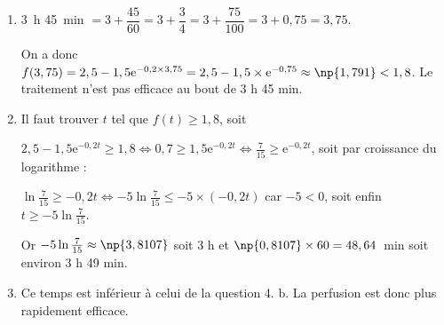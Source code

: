 %
%
%
\begin{enumerate}
\item %
 3~h 45~min $= 3 + \dfrac{45}{60} = 3 + \dfrac{3}{4} = 3 + \dfrac{75}{100} = 3 + 0,75 = 3,75$.
 
 On a donc $f(3,75) = 2,5 - 1,5\text{e}^{-0,2 \times 3,75} = 2,5 - 1,5 \times \text{e}^{-0,75} \approx \np{1,791} <  1,8$. Le traitement n'est pas efficace au bout de 3 h 45 min.
\item %
Il faut trouver $t$ tel que $f(t) \geqslant 1,8$, soit

$2,5 - 1,5\text{e}^{-0,2t} \geqslant 1,8 \iff 0,7 \geqslant 1,5\text{e}^{-0,2t} \iff \frac{7}{15} \geqslant \text{e}^{-0,2t}$, soit par croissance du logarithme :

$\ln \frac{7}{15} \geqslant - 0,2t \iff -5\ln \frac{7}{15} \leqslant -5 \times (- 0,2t)$ car $- 5 < 0$, soit enfin $t \geqslant  -5\ln \frac{7}{15}$.

Or $ -5\ln \frac{7}{15} \approx \np{3,8107}$ soit 3 h et $\np{0,8107} \times 60 = 48,64$~min soit environ 3 h 49 min.
\item %
Ce temps est inférieur à celui de la question 4. b. La perfusion est donc plus rapidement efficace.
\end{enumerate}

\bigskip

